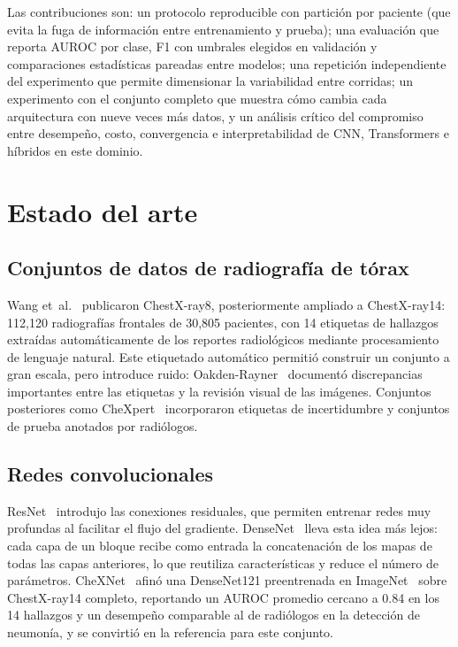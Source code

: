\documentclass[conference]{IEEEtran}
\begin{document}
Las contribuciones son: un protocolo reproducible con partición por paciente (que evita la fuga de información entre entrenamiento y prueba); una evaluación que reporta AUROC por clase, F1 con umbrales elegidos en validación y comparaciones estadísticas pareadas entre modelos; una repetición independiente del experimento que permite dimensionar la variabilidad entre corridas; un experimento con el conjunto completo que muestra cómo cambia cada arquitectura con nueve veces más datos, y un análisis crítico del compromiso entre desempeño, costo, convergencia e interpretabilidad de CNN, Transformers e híbridos en este dominio.

\section{Estado del arte}

\subsection{Conjuntos de datos de radiografía de tórax}
Wang et~al.~\cite{wang2017chestxray} publicaron ChestX-ray8, posteriormente ampliado a ChestX-ray14: 112{,}120 radiografías frontales de 30{,}805 pacientes, con 14 etiquetas de hallazgos extraídas automáticamente de los reportes radiológicos mediante procesamiento de lenguaje natural. Este etiquetado automático permitió construir un conjunto a gran escala, pero introduce ruido: Oakden-Rayner~\cite{oakdenrayner2020exploring} documentó discrepancias importantes entre las etiquetas y la revisión visual de las imágenes. Conjuntos posteriores como CheXpert~\cite{irvin2019chexpert} incorporaron etiquetas de incertidumbre y conjuntos de prueba anotados por radiólogos.

\subsection{Redes convolucionales}
ResNet~\cite{he2016resnet} introdujo las conexiones residuales, que permiten entrenar redes muy profundas al facilitar el flujo del gradiente. DenseNet~\cite{huang2017densenet} lleva esta idea más lejos: cada capa de un bloque recibe como entrada la concatenación de los mapas de todas las capas anteriores, lo que reutiliza características y reduce el número de parámetros. CheXNet~\cite{rajpurkar2017chexnet} afinó una DenseNet121 preentrenada en ImageNet~\cite{deng2009imagenet} sobre ChestX-ray14 completo, reportando un AUROC promedio cercano a 0.84 en los 14 hallazgos y un desempeño comparable al de radiólogos en la detección de neumonía, y se convirtió en la referencia para este conjunto.
\end{document}
